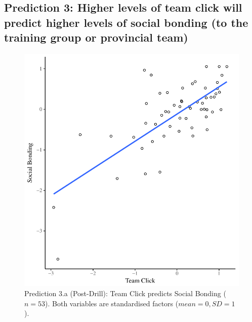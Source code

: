 \begin{CJK}{UTF8}{gbsn}



\subsection{Prediction 3: Higher levels of team click will predict higher levels of social bonding (to the training group or provincial team)}



\begin{figure}
  \centering
    \includegraphics[width=0.5\linewidth,keepaspectratio] {images/groupClickBondScatter}
    \caption{Prediction 3.a (Post-Drill): Team Click predicts Social Bonding ($n = 53$).  Both variables are standardised factors ($mean = 0, SD = 1$).}
    \label{fig:groupClickBondScatter}
\end{figure}



\end{CJK}
